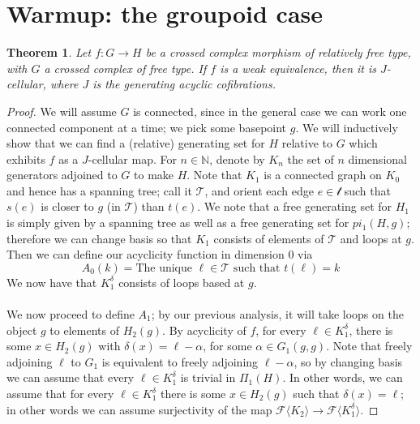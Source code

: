 \documentclass[12pt]{article}
\newtheorem{theorem}{Theorem}[section]
\theoremstyle{definition}
\begin{document}
\section{Warmup: the groupoid case}
	\begin{theorem}
		Let $f: G \to H$ be a crossed complex morphism of relatively free type, with $G$ a crossed complex of free type. 
		If $f$ is a weak equivalence, then it is $J$-cellular, where $J$ is the generating acyclic cofibrations.
	\end{theorem}
	\begin{proof}
		We will assume $G$ is connected, since in the general case we can work one connected component at a time; we pick some basepoint $g$.
		We will inductively show that we can find a (relative) generating set for $H$ relative to $G$ which exhibits $f$ as a $J$-cellular map.
		For $n \in \mathbb{N}$, denote by $K_n$ the set of $n$ dimensional generators adjoined to $G$ to make $H$. 
		Note that $K_1$ is a connected graph on $K_0$ and hence has a spanning tree; call it $\mathcal{T}$, and orient each edge $e \in \mathcal{t}$ such that $s(e)$ is closer to $g$ (in $\mathcal{T}$) than $t(e)$. 
		We note that a free generating set for $H_1$ is simply given by a spanning tree as well as a free generating set for $pi_1(H,g)$; therefore we can change basis so that $K_1$ consists of elements of $\mathcal{T}$ and loops at $g$.
		Then we can define our acyclicity function in dimension $0$ via
		$$A_0(k) = \text{The unique } \ell \in \mathcal{T} \text{ such that } t(\ell) = k$$ 
		We now have that $K_1^\delta$ consists of loops based at $g$.
		\\\\
		We now proceed to define $A_1$; by our previous analysis, it will take loops on the object $g$ to elements of $H_2(g)$. 
		By acyclicity of $f$, for every $\ell \in K_1^\delta$, there is some $x \in H_2(g)$ with $\delta(x) = \ell - \alpha$, for some $\alpha \in G_1(g,g)$. Note that freely adjoining $\ell$ to $G_1$ is equivalent to freely adjoining $\ell - \alpha$, so by changing basis we can assume that every $\ell \in K_1^\delta$ is trivial in $\Pi_1(H)$.
		In other words, we can assume that for every $\ell \in K_1^\delta$ there is some $x \in H_2(g)$ such that $\delta(x) = \ell$; in other words we can assume surjectivity of the map $\mathcal{F}\langle K_2 \rangle \to \mathcal{F}\langle K_1^\delta \rangle$.
	\end{proof}
\end{document}

